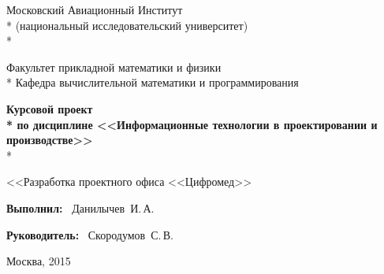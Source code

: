 \begin{titlepage}

\newpage

\begin{center}
Московский Авиационный Институт \\*
(национальный исследовательский университет) \\*

\vspace{2em}

Факультет прикладной математики и физики \\*
Кафедра вычислительной математики и программирования

\vspace{10em}

\Large \textbf{Курсовой проект \\*
по дисциплине <<Информационные технологии в проектировании и производстве>>} \\*

\vspace{3em}

<<Разработка проектного офиса <<Цифромед>>
\end{center}

\vspace{8em}

\hspace{25em}\vbox{
  \hbox{\bfseries{Выполнил:}}
  \hbox{\hspace{1em} Данилычев И.\,А.}
}

\vspace{2em}

\hspace{25em}\vbox{
  \hbox{\bfseries{Руководитель:}}
  \hbox{\hspace{1em} Скородумов С.\,В.}
}

\vspace{\fill}

\begin{center}
Москва, 2015
\end{center}

\end{titlepage}
